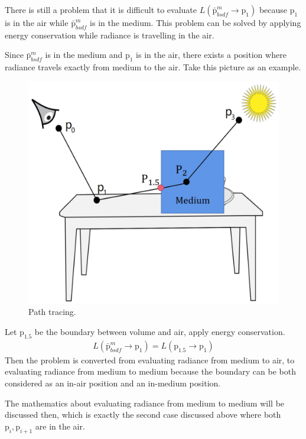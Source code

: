 \documentclass[acmtog]{acmart}
\def\p{\mathrm{p}}
\def\pp#1#2{\p_{#1}\rightarrow\p_{#2}}
\begin{document}
There is still a problem that it is difficult to evaluate $L(\bar{\p}^m_{bsdf}\rightarrow\p_1)$ because 
$\p_1$ is in the air while $\bar{\p}^m_{bsdf}$ is in the medium.
This problem can be solved by applying energy conservation while radiance is travelling in the air.\par
Since $\bar{\p}^m_{bsdf}$ is in the medium and $\p_1$ is in the air, 
there exists a position where radiance travels exactly from medium to the air.
Take this picture as an example.
\begin{figure}[H]
	\includegraphics[scale=0.045]{pictures/volume path tracing.jpg}
	\centering
	\caption{Path tracing.}
\end{figure}
Let $\p_{1.5}$ be the boundary between volume and air, apply energy conservation.
\begin{equation} \label{eq10}
	\begin{split}
		L(\bar{\p}^m_{bsdf}\rightarrow\p_1) = L(\pp{1.5}{1})
	\end{split}
\end{equation}
Then the problem is converted from evaluating radiance from medium to air, to evaluating radiance from medium to medium
because the boundary can be both considered as an in-air position and an in-medium position.\par
The mathematics about evaluating radiance from medium to medium will be discussed then, 
which is exactly the second case discussed above where both $\p_i,\p_{i+1}$ are in the air.
\end{document}
